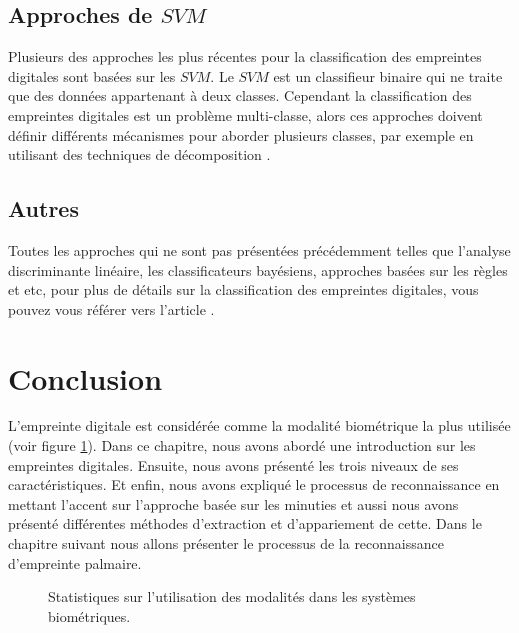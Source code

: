 	\subsection{Approches de $ SVM $}
	Plusieurs des approches les plus récentes pour la classification des empreintes digitales sont basées sur les $ SVM $. Le $ SVM $ est un classifieur binaire qui ne traite que des données appartenant à deux classes. Cependant la classification des empreintes digitales est un problème multi-classe, alors ces approches doivent définir différents mécanismes pour aborder plusieurs classes, par exemple en utilisant des techniques de décomposition \citep{lorena2008review}.
	\subsection{Autres}
	Toutes les approches qui ne sont pas présentées précédemment telles que l'analyse discriminante linéaire, les classificateurs bayésiens, approches basées sur les règles et etc, pour plus de détails sur la classification des empreintes digitales, vous pouvez vous référer vers l'article \citep{galar2015survey}.
	
	
	
 \section{Conclusion}
 
L’empreinte digitale est considérée comme la modalité biométrique la plus utilisée (voir figure \ref{fig:chapitre2fingerstat}). Dans ce chapitre, nous avons abordé une introduction sur les empreintes digitales. Ensuite, nous avons présenté les trois niveaux de ses caractéristiques. Et enfin,  nous avons expliqué le processus de reconnaissance en mettant l'accent sur l'approche basée sur les minuties et aussi nous avons présenté différentes méthodes d’extraction et d’appariement de cette. Dans le chapitre suivant nous allons présenter le processus de la reconnaissance d'empreinte palmaire.
  \begin{figure}[H]
 	\centering
 	\caption{Statistiques sur l’utilisation des modalités dans les systèmes biométriques\citep{Counter2016}.}
 	\label{fig:chapitre2fingerstat}
 \end{figure}